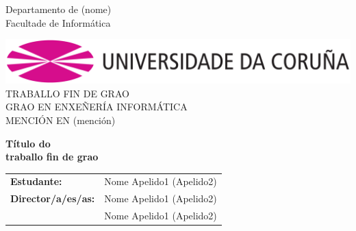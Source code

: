 \begin{titlepage}
  
  \hspace*{128pt}
  \textcolor{udcgray}{{\selectfont Departamento de (nome)}}\\[-2pt]
  \hspace*{145pt}
  \textcolor{udcpink}{{\selectfont Facultade de Informática}}\\[-32pt]

  \begin{center}
    \includegraphics[scale=0.3]{imaxes/udc}\\[35pt]

    {\large TRABALLO FIN DE GRAO \\
            GRAO EN ENXEÑERÍA INFORMÁTICA \\
            MENCIÓN EN (mención) } \\[100pt]
    
    \begin{huge}
      \bfseries Título do \\[7pt]
                traballo fin de grao
    \end{huge}
  \end{center}
  
  \vfill
  
  \begin{flushright}
    {\large
    \begin{tabular}{ll}
      {\bf Estudante:}        & Nome Apelido1 (Apelido2) \\
      {\bf Director/a/es/as:} & Nome Apelido1 (Apelido2) \\
                              & Nome Apelido1 (Apelido2) \\
    \end{tabular}}
  \end{flushright}
\end{titlepage}
